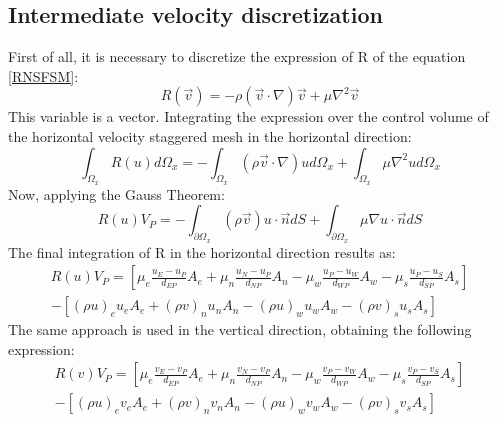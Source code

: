 \subsection{Intermediate velocity discretization}
First of all, it is necessary to discretize the expression of R of the equation \ref{RNSFSM}:
\begin{equation}
R\left(\vec{v}\right)=-\rho\left(\vec{v}\cdot\nabla\right)\vec{v}+\mu\nabla^{2}\vec{v}
\end{equation}
This variable is a vector. Integrating the expression over the control volume of the horizontal velocity staggered mesh in the horizontal direction:
\begin{equation}
\int_{\Omega_{x}}R\left(u\right)d\Omega_{x}=-\int_{\Omega_{x}}\left(\rho\vec{v}\cdot\nabla\right)ud\Omega_{x}+\int_{\Omega_{x}}\mu\nabla^{2}ud\Omega_{x}
\end{equation}
Now, applying the Gauss Theorem:
\begin{equation}
R\left(u\right)V_{P}=-\int_{\partial\Omega_{x}}\left(\rho\vec{v}\right)u\cdot\vec{n}dS+\int_{\partial\Omega_{x}}\mu\nabla u\cdot\vec{n}dS
\end{equation}
The final integration of R in the horizontal direction results as:
\begin{multline}
R\left(u\right)V_{P}=\left[\mu_{e}\frac{u_{E}-u_{P}}{d_{EP}}A_{e}+\mu_{n}\frac{u_{N}-u_{P}}{d_{NP}}A_{n}-\mu_{w}\frac{u_{P}-u_{W}}{d_{WP}}A_{w}-\mu_{s}\frac{u_{P}-u_{S}}{d_{SP}}A_{s}\right] \\
-\left[\left(\rho u\right)_{e}u_{e}A_{e}+\left(\rho v\right)_{n}u_{n}A_{n}-\left(\rho u\right)_{w}u_{w}A_{w}-\left(\rho v\right)_{s}u_{s}A_{s}\right]
\end{multline}
The same approach is used in the vertical direction, obtaining the following expression:
\begin{multline}
	R\left(v\right)V_{P}=\left[\mu_{e}\frac{v_{E}-v_{P}}{d_{EP}}A_{e}+\mu_{n}\frac{v_{N}-v_{P}}{d_{NP}}A_{n}-\mu_{w}\frac{v_{P}-v_{W}}{d_{WP}}A_{w}-\mu_{s}\frac{v_{P}-v_{S}}{d_{SP}}A_{s}\right] \\
	-\left[\left(\rho u\right)_{e}v_{e}A_{e}+\left(\rho v\right)_{n}v_{n}A_{n}-\left(\rho u\right)_{w}v_{w}A_{w}-\left(\rho v\right)_{s}v_{s}A_{s}\right]
\end{multline}

